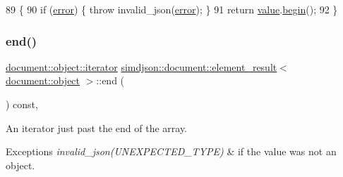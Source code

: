 \begin{DoxyCode}
89                                                                                                   \{
90   \textcolor{keywordflow}{if} (\hyperlink{classsimdjson_1_1document_1_1element__result_3_01document_1_1object_01_4_afb94302f28fe94b4eee922f4803abf86}{error}) \{ \textcolor{keywordflow}{throw} invalid\_json(\hyperlink{classsimdjson_1_1document_1_1element__result_3_01document_1_1object_01_4_afb94302f28fe94b4eee922f4803abf86}{error}); \}
91   \textcolor{keywordflow}{return} \hyperlink{classsimdjson_1_1document_1_1element__result_3_01document_1_1object_01_4_a65174f23d014d2e7d6ed87f42b60045a}{value}.\hyperlink{classsimdjson_1_1document_1_1object_a88e638207141099532b524a8814540e0}{begin}();
92 \}
\end{DoxyCode}
\mbox{\label{classsimdjson_1_1document_1_1element__result_3_01document_1_1object_01_4_acec887c649977b2902142b8690e355dc}} 
\subsubsection{\texorpdfstring{end()}{end()}}
{\footnotesize\ttfamily \hyperlink{classsimdjson_1_1document_1_1object_1_1iterator}{document\+::object\+::iterator} \hyperlink{classsimdjson_1_1document_1_1element__result}{simdjson\+::document\+::element\+\_\+result}$<$ \hyperlink{classsimdjson_1_1document_1_1object}{document\+::object} $>$\+::end (\begin{DoxyParamCaption}{ }\end{DoxyParamCaption}) const\hspace{0.3cm}{\ttfamily [inline]}, {\ttfamily [noexcept]}}



An iterator just past the end of the array. 


\begin{DoxyExceptions}{Exceptions}
{\em invalid\+\_\+json(\+U\+N\+E\+X\+P\+E\+C\+T\+E\+D\+\_\+\+T\+Y\+P\+E)} & if the value was not an object. \\
\hline
\end{DoxyExceptions}


